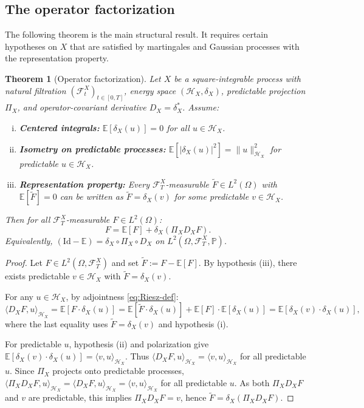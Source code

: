 \documentclass[11pt,a4paper]{article}
\theoremstyle{plain}
\newtheorem{theorem}{Theorem}[section]
\theoremstyle{definition}
\theoremstyle{remark}
\newcommand{\E}{\mathbb{E}}
\newcommand{\Id}{\mathrm{Id}}
\newcommand{\ip}[2]{\langle #1, #2 \rangle}
\newcommand{\norm}[1]{\| #1 \|}
\newcommand{\Prob}{\mathbb{P}}
\newcommand{\Lp}[1]{L^{#1}}
\newcommand{\Ft}{\mathcal{F}_t}
\newcommand{\FT}{\mathcal{F}_T}
\newcommand{\HX}{\mathcal{H}_X}
\begin{document}
\subsection{The operator factorization}

The following theorem is the main structural result. It requires certain hypotheses on $X$ that are satisfied by martingales and Gaussian processes with the representation property.

\begin{theorem}[Operator factorization]\label{thm:general-factorization}
Let $X$ be a square-integrable process with natural filtration $(\Ft^X)_{t \in [0,T]}$, energy space $(\HX, \delta_X)$, predictable projection $\Pi_X$, and operator-covariant derivative $D_X = \delta_X^*$. Assume:
\begin{enumerate}[(i)]
\item \textbf{Centered integrals:} $\E[\delta_X(u)] = 0$ for all $u \in \HX$.
\item \textbf{Isometry on predictable processes:} $\E[|\delta_X(u)|^2] = \norm{u}_{\HX}^2$ for predictable $u \in \HX$.
\item \textbf{Representation property:} Every $\FT^X$-measurable $\tilde{F} \in \Lp{2}(\Omega)$ with $\E[\tilde{F}] = 0$ can be written as $\tilde{F} = \delta_X(v)$ for some predictable $v \in \HX$.
\end{enumerate}
Then for all $\FT^X$-measurable $F \in \Lp{2}(\Omega)$:
\begin{equation}\label{eq:factorization}
F = \E[F] + \delta_X(\Pi_X D_X F).
\end{equation}
Equivalently, $(\Id - \E) = \delta_X \circ \Pi_X \circ D_X$ on $\Lp{2}(\Omega, \FT^X, \Prob)$.
\end{theorem}

\begin{proof}
Let $F \in \Lp{2}(\Omega, \FT^X)$ and set $\tilde{F} := F - \E[F]$. By hypothesis (iii), there exists predictable $v \in \HX$ with $\tilde{F} = \delta_X(v)$.

For any $u \in \HX$, by adjointness \eqref{eq:Riesz-def}:
\[
\ip{D_X F}{u}_{\HX} = \E[F \cdot \delta_X(u)] = \E[\tilde{F} \cdot \delta_X(u)] + \E[F] \cdot \E[\delta_X(u)] = \E[\delta_X(v) \cdot \delta_X(u)],
\]
where the last equality uses $\tilde{F} = \delta_X(v)$ and hypothesis (i).

For predictable $u$, hypothesis (ii) and polarization give $\E[\delta_X(v) \cdot \delta_X(u)] = \ip{v}{u}_{\HX}$. Thus $\ip{D_X F}{u}_{\HX} = \ip{v}{u}_{\HX}$ for all predictable $u$. Since $\Pi_X$ projects onto predictable processes, $\ip{\Pi_X D_X F}{u}_{\HX} = \ip{D_X F}{u}_{\HX} = \ip{v}{u}_{\HX}$ for all predictable $u$. As both $\Pi_X D_X F$ and $v$ are predictable, this implies $\Pi_X D_X F = v$, hence $\tilde{F} = \delta_X(\Pi_X D_X F)$.
\end{proof}
\end{document}
